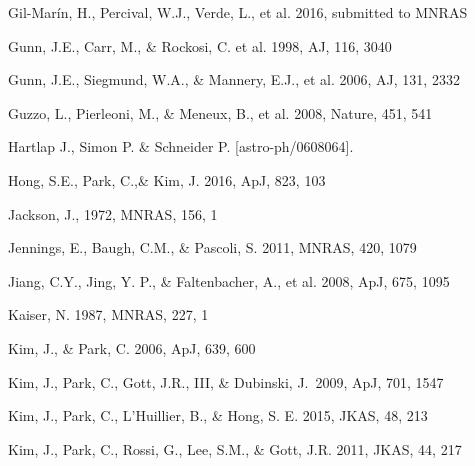 \documentclass[iop]{emulateapj}
\begin{document}
\begin{thebibliography}{}




Gil-Mar\'{i}n, H., Percival, W.J., Verde, L., et al. 2016, submitted to MNRAS


Gunn, J.E., Carr, M., \& Rockosi, C. et al. 1998, AJ, 116, 3040

Gunn, J.E., Siegmund, W.A., \& Mannery, E.J., et al. 2006, AJ, 131, 2332

Guzzo, L., Pierleoni, M., \& Meneux, B., et al. 2008, Nature, 451, 541

Hartlap J., Simon P. \& Schneider P. [astro-ph/0608064].

Hong, S.E., Park, C.,\&  Kim, J. 2016, ApJ, 823, 103

Jackson, J., 1972, MNRAS, 156, 1

Jennings, E., Baugh, C.M., \& Pascoli, S. 2011, MNRAS, 420, 1079  


Jiang, C.Y., Jing, Y. P., \& Faltenbacher, A., et al. 2008, ApJ, 675, 1095

Kaiser, N. 1987, MNRAS, 227, 1


Kim, J., \& Park, C. 2006, ApJ, 639, 600  

Kim, J., Park, C., Gott, J.R., III, \& Dubinski, J.\ 2009, ApJ, 701, 1547 

Kim, J., Park, C., L'Huillier, B., \& Hong, S. E. 2015, JKAS, 48, 213

Kim, J., Park, C., Rossi, G., Lee, S.M., \& Gott, J.R. 2011, JKAS, 44, 217  


\end{thebibliography}
\end{document}
